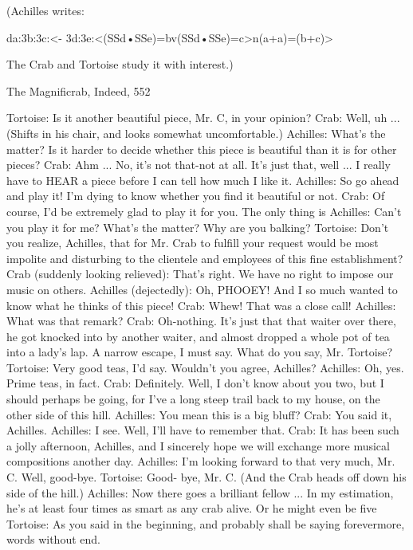 {(Achilles writes:

              da:3b:3c:<- 3d:3e:<(SSd•SSe)=bv(SSd•SSe)=c>n(a+a)=(b+c)>

The Crab and Tortoise study it with interest.)



   The Magnificrab, Indeed,                                                               552

Tortoise: Is it another beautiful piece, Mr. C, in your opinion?
Crab: Well, uh ... (Shifts in his chair, and looks somewhat uncomfortable.)
Achilles: What's the matter? Is it harder to decide whether this piece is beautiful than it is for
  other pieces?
Crab: Ahm ... No, it's not that-not at all. It's just that, well ... I really have to HEAR a piece
  before I can tell how much I like it.
Achilles: So go ahead and play it! I'm dying to know whether you find it beautiful or not.
Crab: Of course, I'd be extremely glad to play it for you. The only thing is
Achilles: Can't you play it for me? What's the matter? Why are you balking?
Tortoise: Don't you realize, Achilles, that for Mr. Crab to fulfill your request would be most
  impolite and disturbing to the clientele and employees of this fine establishment?
Crab (suddenly looking relieved): That's right. We have no right to impose our music on
  others.
Achilles (dejectedly): Oh, PHOOEY! And I so much wanted to know what he thinks of this
  piece!
Crab: Whew! That was a close call!
Achilles: What was that remark?
Crab: Oh-nothing. It's just that that waiter over there, he got knocked into by another waiter,
  and almost dropped a whole pot of tea into a lady's lap. A narrow escape, I must say.
  What do you say, Mr. Tortoise? Tortoise: Very good teas, I'd say. Wouldn't you agree,
  Achilles? Achilles: Oh, yes. Prime teas, in fact.
Crab: Definitely. Well, I don't know about you two, but I should perhaps be going, for I've a
  long steep trail back to my house, on the other side of this hill.
Achilles: You mean this is a big bluff?
Crab: You said it, Achilles.
Achilles: I see. Well, I'll have to remember that.
Crab: It has been such a jolly afternoon, Achilles, and I sincerely hope we will exchange
  more musical compositions another day.
Achilles: I'm looking forward to that very much, Mr. C. Well, good-bye. Tortoise: Good-
  bye, Mr. C.
(And the Crab heads off down his side of the hill.)
Achilles: Now there goes a brilliant fellow ... In my estimation, he's at least four times as
  smart as any crab alive. Or he might even be five
Tortoise: As you said in the beginning, and probably shall be saying forevermore, words
  without end.




}
